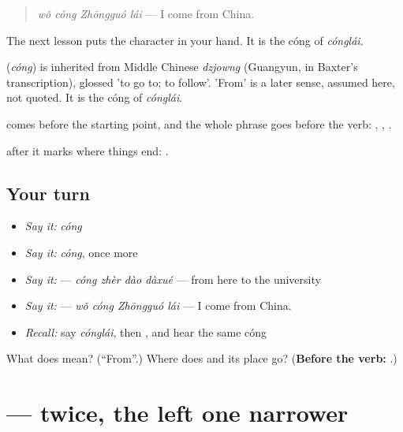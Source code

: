 \begin{quote}
\textbf{} \emph{wǒ cóng Zhōngguó lái} — I come from China.
\end{quote}

The next lesson puts the character in your hand. It is the cóng of \emph{cónglái}.

\begin{cousinweb}
\textbf{} (\emph{cóng}) is inherited from Middle Chinese \emph{dzjowng} (Guangyun, in Baxter's transcription), glossed 'to go to; to follow'. 'From' is a later sense, assumed here, not quoted. It is the cóng of \emph{cónglái}.
\end{cousinweb}

\begin{grammarlens}[title={What you've built}]
 comes before the starting point, and the whole phrase goes before the verb: , , .

 after it marks where things end: .
\end{grammarlens}

\subsection*{Your turn}
\begin{itemize}
\raggedright
  \item \emph{Say it:} \emph{cóng}
  \item \emph{Say it:} \emph{cóng}, once more
  \item \emph{Say it:}  — \emph{cóng zhèr dào dàxué} — from here to the university
  \item \emph{Say it:}  — \emph{wǒ cóng Zhōngguó lái} — I come from China.
  \item \emph{Recall:} say \emph{cónglái}, then , and hear the same cóng
\end{itemize}

\begin{tcolorbox}[breakable,colback=teal!4,colframe=teal!35!black,title={Before you move on}]
What does  mean? (\textquotedblleft{}From\textquotedblright{}.) Where does  and its place go? (\textbf{Before the verb: }.)
\end{tcolorbox}
\section[\texorpdfstring{\zh{从} (cóng)}{从 (cóng)}]{ —  twice, the left one narrower}

